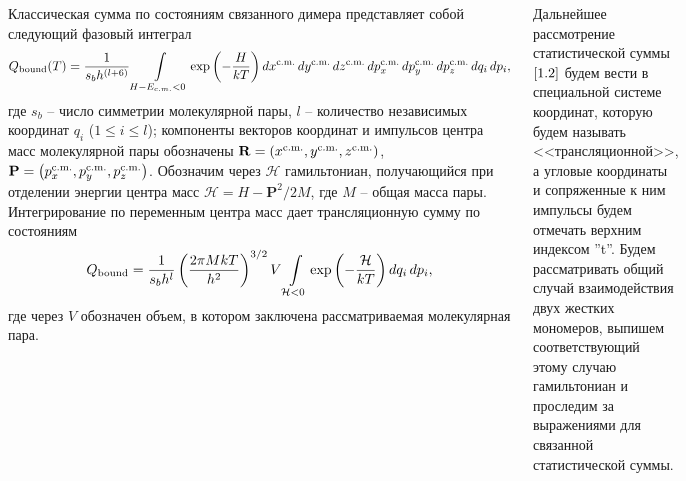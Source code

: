 \documentclass[
  14pt,
  a1paper,
  portrait, 
  margin=0mm,
  innermargin=15mm,
  blockverticalspace=0mm,
  colspace=0mm,
  subcolspace=0mm
]{tikzposter}
\newcommand{\lb}{\left(}
\newcommand{\rb}{\right)}
\newcommand{\mH}{\mathcal{H}}
\begin{document}
\begin{columns}
{
	Классическая сумма по состояниям связанного димера представляет собой следующий фазовый интеграл
	\begin{gather}
			Q_{\textup{bound}}(T) = \frac{1}{s_b h^{(l + 6)}} \int\limits_{H - E_{c.m.} < 0} \exp \left( -\frac{H}{kT} \right) dx^{\textup{c.m.}} \, dy^\textup{c.m.} \, dz^\textup{c.m.} \, dp_x^\textup{c.m.} \, dp_y^\textup{c.m.} \, dp_z^\textup{c.m.} \, dq_i \, dp_i, \label{1.1}
	\end{gather}
	где $s_b$ -- число симметрии молекулярной пары, $l$ -- количество независимых координат $q_i$ ($1 \leqslant i \leqslant l$); компоненты векторов координат и импульсов центра масс молекулярной пары обозначены $\mathbf{R} = \lb x^\textup{c.m.}, y^\textup{c.m.}, z^\textup{c.m.} \rb$, $\mathbf{P} = \lb p_x^\textup{c.m.}, p_y^\textup{c.m.}, p_z^\textup{c.m.} \rb$. Обозначим через $\mH$ гамильтониан, получающийся при отделении энергии центра масс $\mH = H - \mathbf{P}^2/2M$, где $M$ -- общая масса пары. Интегрирование по переменным центра масс дает трансляционную сумму по состояниям
	\begin{gather}
			Q_\textup{bound} = \frac{1}{s_b h^l} \lb \frac{2 \pi M k T}{h^2} \rb^{3/2} V \int\limits_{\mH < 0} \exp \lb - \frac{\mH}{kT} \rb dq_i \, dp_i, \label{1.2}
	\end{gather}
	где через $V$ обозначен объем, в котором заключена рассматриваемая молекулярная пара. \par
	Дальнейшее рассмотрение статистической суммы $\eqref{1.2}$ будем вести в специальной системе координат, которую будем называть <<трансляционной>>, а угловые координаты и сопряженные к ним импульсы будем отмечать верхним индексом ''t''. Будем рассматривать общий случай взаимодействия двух жестких мономеров, выпишем соответствующий этому случаю гамильтониан и проследим за выражениями для связанной статистической суммы. 
	
	\vspace*{-0.5cm}
}
\end{columns}
\end{document}
